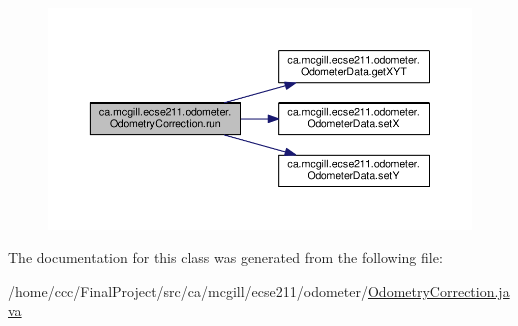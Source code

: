 \begin{figure}[H]
\begin{center}
\leavevmode
\includegraphics[width=350pt]{classca_1_1mcgill_1_1ecse211_1_1odometer_1_1_odometry_correction_aad66a7030ac00f3a9cbe7bc33c25acbf_cgraph}
\end{center}
\end{figure}


The documentation for this class was generated from the following file\+:\begin{DoxyCompactItemize}
\item 
/home/ccc/\+Final\+Project/src/ca/mcgill/ecse211/odometer/\hyperlink{_odometry_correction_8java}{Odometry\+Correction.\+java}\end{DoxyCompactItemize}
